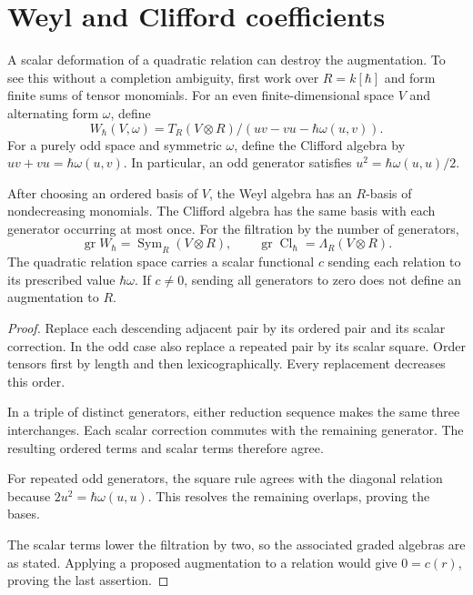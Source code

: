 \section{Weyl and Clifford coefficients}

A scalar deformation of a quadratic relation can destroy the augmentation.
To see this without a completion ambiguity, first work over $R=k[\hbar]$ and form finite sums of tensor monomials.
For an even finite-dimensional space $V$ and alternating form $\omega$, define
\[
 W_\hbar(V,\omega)=T_R(V\otimes R)\big/
 (uv-vu-\hbar\omega(u,v)).
\]
For a purely odd space and symmetric $\omega$, define the Clifford algebra by
$uv+vu=\hbar\omega(u,v)$.
In particular, an odd generator satisfies $u^2=\hbar\omega(u,u)/2$.

\begin{proposition}
\label{prop:alg-weyl-clifford}
After choosing an ordered basis of $V$, the Weyl algebra has an $R$-basis of nondecreasing monomials.
The Clifford algebra has the same basis with each generator occurring at most once.
For the filtration by the number of generators,
\[
 \operatorname{gr}W_\hbar=\operatorname{Sym}_R(V\otimes R),
 \qquad
 \operatorname{gr}\operatorname{Cl}_\hbar=\Lambda_R(V\otimes R).
\]
The quadratic relation space carries a scalar functional $c$ sending each relation to its prescribed value $\hbar\omega$.
If $c\ne0$, sending all generators to zero does not define an augmentation to $R$.
\end{proposition}
\begin{proof}
Replace each descending adjacent pair by its ordered pair and its scalar correction.
In the odd case also replace a repeated pair by its scalar square.
Order tensors first by length and then lexicographically.
Every replacement decreases this order.

In a triple of distinct generators, either reduction sequence makes the same three interchanges. Each scalar correction commutes with the remaining generator.
The resulting ordered terms and scalar terms therefore agree.

For repeated odd generators, the square rule agrees with the diagonal relation because $2u^2=\hbar\omega(u,u)$.
This resolves the remaining overlaps, proving the bases.

The scalar terms lower the filtration by two, so the associated graded algebras are as stated.
Applying a proposed augmentation to a relation would give $0=c(r)$, proving the last assertion.
\end{proof}

